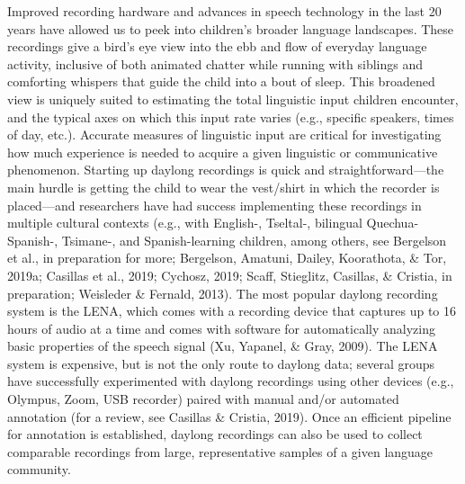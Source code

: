 \documentclass[,man,floatsintext]{apa6}
\begin{document}
Improved recording hardware and advances in speech technology in the
last 20 years have allowed us to peek into children's broader language
landscapes. These recordings give a bird's eye view into the ebb and
flow of everyday language activity, inclusive of both animated chatter
while running with siblings and comforting whispers that guide the child
into a bout of sleep. This broadened view is uniquely suited to
estimating the total linguistic input children encounter, and the
typical axes on which this input rate varies (e.g., specific speakers,
times of day, etc.). Accurate measures of linguistic input are critical
for investigating how much experience is needed to acquire a given
linguistic or communicative phenomenon. Starting up daylong recordings
is quick and straightforward---the main hurdle is getting the child to
wear the vest/shirt in which the recorder is placed---and researchers
have had success implementing these recordings in multiple cultural
contexts (e.g., with English-, Tseltal-, bilingual Quechua-Spanish-,
Tsimane-, and Spanish-learning children, among others, see Bergelson et
al., in preparation for more; Bergelson, Amatuni, Dailey, Koorathota, \&
Tor, 2019a; Casillas et al., 2019; Cychosz, 2019; Scaff, Stieglitz,
Casillas, \& Cristia, in preparation; Weisleder \& Fernald, 2013). The
most popular daylong recording system is the LENA, which comes with a
recording device that captures up to 16 hours of audio at a time and
comes with software for automatically analyzing basic properties of the
speech signal (Xu, Yapanel, \& Gray, 2009). The LENA system is
expensive, but is not the only route to daylong data; several groups
have successfully experimented with daylong recordings using other
devices (e.g., Olympus, Zoom, USB recorder) paired with manual and/or
automated annotation (for a review, see Casillas \& Cristia, 2019). Once
an efficient pipeline for annotation is established, daylong recordings
can also be used to collect comparable recordings from large,
representative samples of a given language community.
\end{document}
